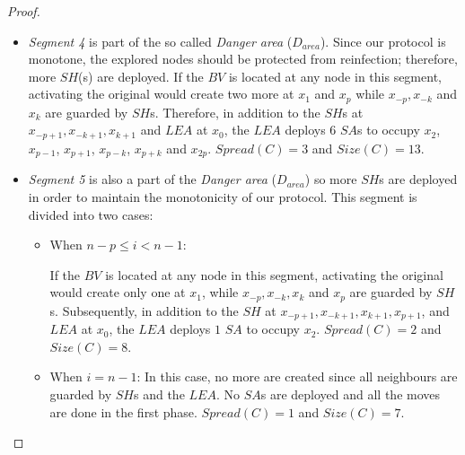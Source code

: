 \begin{proof}
\begin{itemize}
\item {\em Segment 4} is part of the so called {\it Danger area} ($D_{area}$). Since our protocol is monotone, the explored nodes should be protected from reinfection; therefore, more $SH$(s) are deployed.  
If the $BV$ is located at any node in this segment, activating the original \bv would create two more \bvs at $x_{1}$ and $x_{p}$ while $x_{-p},x_{-k}$ and $x_{k}$ are guarded by $SH$s. Therefore, in addition to the $SH$s at $x_{-p+1},x_{-k+1},x_{k+1}$ and $LEA$ at $x_{0}$, the $LEA$ deploys $6$  $SA$s to occupy $x_{2}$, $x_{p-1}$, $x_{p+1}$, $x_{p-k}$, $x_{p+k}$ and $x_{2p}$. $Spread(C)=3$ and $Size(C)=13$.   

\item 
{\em Segment 5} is also a part of the {\it Danger area} ($D_{area}$) so more $SH$s are deployed in order to maintain the monotonicity of our protocol. This segment is divided into two cases:
\begin{itemize}
\item When $n-p\leq i < n-1$:

If the $BV$ is located at any node in this segment, activating the original \bv would create only one \bv at $x_{1}$, while $x_{-p},x_{-k},x_{k}$ and $x_{p}$ are guarded by $SH$s. Subsequently, in addition to the $SH$ at $x_{-p+1},x_{-k+1},x_{k+1},x_{p+1}$, and $LEA$ at $x_{0}$, the $LEA$ deploys $1$  $SA$ to occupy $x_{2}$. $Spread(C)=2$ and $Size(C)=8$.  
\item  When $i=n-1$: 
In this case, no more \bvs are created since all neighbours are guarded by $SH$s and the $LEA$. No $SA$s are deployed and all the moves are done in the first phase. $Spread(C)=1$ and $Size(C)=7$.  
\end{itemize}
\end{itemize}
\end{proof}
%

